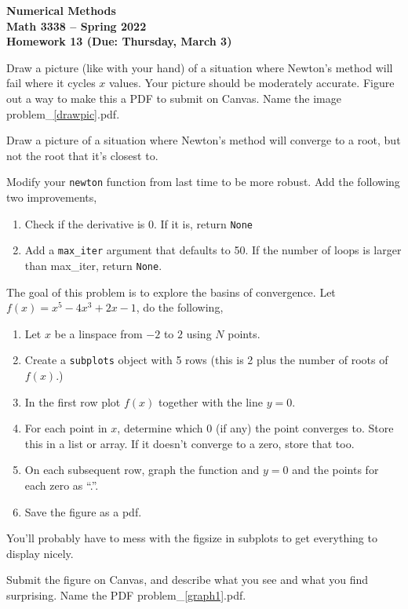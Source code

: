 \documentclass[11pt,letterpaper]{article}
\newcommand{\semester}{Spring 2022}
\newcommand{\due}{Thursday, March 3}
\begin{document}
\begin{center}
{\huge{\bf  Numerical Methods}} \\[1.5ex]
{\bf Math 3338 -- \semester}\\[1.5ex]
{\Large{\bf Homework 13 (Due: \due)}}\\
\end{center}
\vspace{2mm}

\begin{problem}
\label{drawpic}
 Draw a picture (like with your hand) of a situation where Newton's method will fail where it 
cycles $x$ values. Your picture should be moderately accurate. Figure out a way to make this a
PDF to submit on Canvas. Name the image problem\_\ref{drawpic}.pdf.
\end{problem}


\begin{problem}
 Draw a picture of a situation where Newton's method will converge to a root, but not the root
that it's closest to.
\end{problem}

\begin{problem}
 Modify your \texttt{newton} function from last time to be more robust. Add the following two
improvements,
\begin{enumerate}
 \item Check if the derivative is 0. If it is, return \texttt{None}
 \item Add a \texttt{max\_iter} argument that defaults to 50. If the number of loops is larger than
max\_iter, return \texttt{None}.
\end{enumerate}
\end{problem}



\begin{problem}
\label{graph1}
 The goal of this problem is to explore the basins of convergence. Let $f(x) = x^5-4x^3+2x-1$, do 
the following,
\begin{enumerate}
 \item Let $x$ be a linspace from $-2$ to $2$ using $N$ points.
 \item Create a \texttt{subplots} object with 5 rows (this is 2 plus the number of roots of $f(x)$.)
 \item In the first row plot $f(x)$ together with the line $y=0$. 
 \item For each point in $x$, determine which $0$ (if any) the point converges to. Store this in 
a list or array. If it doesn't converge to a zero, store that too.
 \item On each subsequent row, graph the function and $y=0$ and the points for each zero as 
``.''. 
 \item Save the figure as a pdf.
\end{enumerate}
You'll probably have to mess with the figsize in subplots to get everything to display nicely.

Submit the figure on Canvas, and describe what you see and what you find surprising. Name the PDF
problem\_\ref{graph1}.pdf.

\end{problem}
\end{document}
